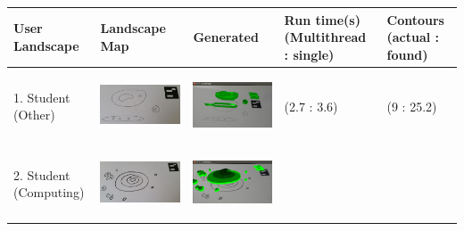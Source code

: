 \documentclass[11pt]{article}
\begin{document}
\newpage
\begin{landscape}
\centering
\begin{longtable}{p{}| p{}| p{} | p{} |p{}}
\hline
User Landscape 		& Landscape Map 			& Generated 	& Run time(s) (Multithread : single) & Contours (actual : found)\\
\hline
1. Student (Other) & \begin{center}\includegraphics[scale=0.5]{pics/usertesting/1.png}\end{center} 
							& \begin{center}\includegraphics[scale=0.5]{pics/usertesting/1render.png}\end{center} 
							& (2.7 : 3.6)
							& (9 : 25.2)\\
\hline
2. Student (Computing) & \begin{center}\includegraphics[scale=0.5]{pics/usertesting/2.png}\end{center} 
							& \begin{center}\includegraphics[scale=0.5]{pics/usertesting/2render.png}\end{center} 

\end{longtable}
\end{landscape}
\end{document}
